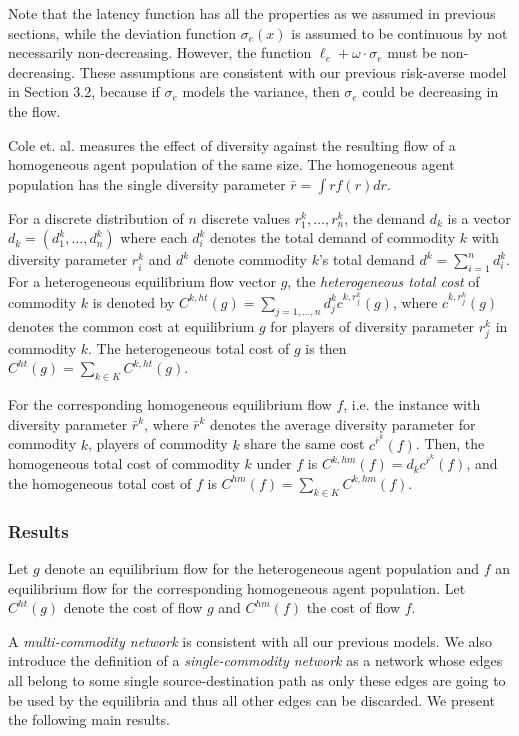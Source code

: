 Note that the latency function has all the properties as we assumed in previous sections, while the deviation function $\sigma_e(x)$ is assumed to be continuous by not necessarily non-decreasing. However, the function $\ell_e+\omega\cdot \sigma_e$ must be non-decreasing. These assumptions are consistent with our previous risk-averse model in Section 3.2, because if $\sigma_e$ models the variance, then $\sigma_e$ could be decreasing in the flow.

Cole et. al. measures the effect of diversity against the resulting flow of a homogeneous agent population of the same size. The homogeneous agent population has the single diversity parameter $\bar{r}=\int rf(r)d r$. 

For a discrete distribution of $n$ discrete values $r_1^k, \dots, r_n^k$, the demand $d_k$ is a vector $d_k=(d_1^k, \dots, d_n^k)$ where each $d_i^k$ denotes the total demand of commodity $k$ with diversity parameter $r_i^k$ and $d^k$ denote commodity $k$'s total demand $d^k=\sum_{i=1}^n d_i^k$. For a heterogeneous equilibrium flow vector $g$, the {\it heterogeneous total cost} of commodity $k$ is denoted by $C^{k,ht}(g)=\sum_{j=1,\dots, n} d_j^k c^{k, r_j^k}(g)$, where $c^{k, r_j^k}(g)$ denotes the common cost at equilibrium $g$ for players of diversity parameter $r_j^k$ in commodity $k$. The heterogeneous total cost of $g$ is then $C^{ht}(g)=\sum_{k\in K} C^{k,ht}(g)$. 

For the corresponding homogeneous equilibrium flow $f$, i.e. the instance with diversity parameter $\bar{r}^k$, where $\bar{r}^k$ denotes the average diversity parameter for commodity $k$, players of commodity $k$ share the same cost $c^{\bar{r}^k}(f)$. Then, the homogeneous total cost of commodity $k$ under $f$ is $C^{k,hm}(f)=d_kc^{\bar{r}^k}(f)$, and the homogeneous total cost of $f$ is $C^{hm}(f)=\sum_{k\in K} C^{k,hm}(f)$. 


\subsubsection{Results}
Let $g$ denote an equilibrium flow for the heterogeneous agent population and $f$ an equilibrium flow for the corresponding homogeneous agent population. Let $C^{ht}(g)$ denote the cost of flow $g$ and $C^{hm}(f)$ the cost of flow $f$. 

A {\it multi-commodity network} is consistent with all our previous models. We also introduce the definition of a {\it single-commodity network} as a network whose edges all belong to some single source-destination path as only these edges are going to be used by the equilibria and thus all other edges can be discarded. We present the following main results.

